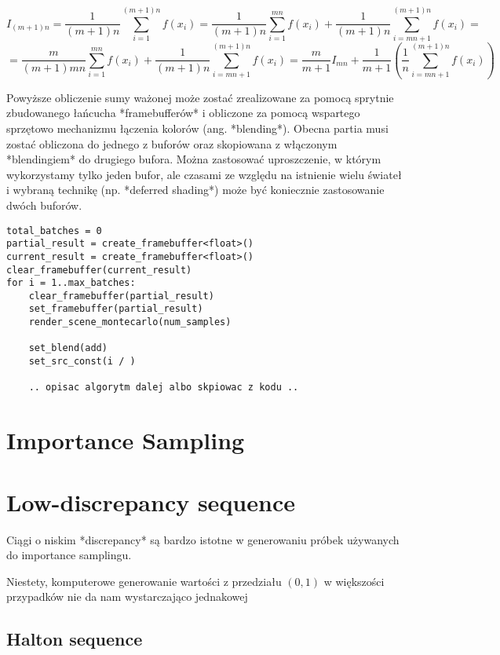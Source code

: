 \documentclass[../main.tex]{subfiles}
\begin{document}
$$
I_{(m+1)n} = \frac{1}{(m+1)n} \sum_{i=1}^{(m+1)n} f(x_i)
= \frac{1}{(m+1)n} \sum_{i=1}^{mn} f(x_i)
    + \frac{1}{(m+1)n} \sum_{i=mn+1}^{(m+1)n} f(x_i) =
$$
$$
= \frac{m}{(m+1)mn} \sum_{i=1}^{mn} f(x_i)
    + \frac{1}{(m+1)n} \sum_{i=mn+1}^{(m+1)n} f(x_i)
= \frac{m}{m+1}I_{mn}
    + \frac{1}{m+1} \left(
        \frac{1}{n} \sum_{i=mn+1}^{(m+1)n} f(x_i)
    \right)
$$

Powyższe obliczenie sumy ważonej może zostać zrealizowane za pomocą sprytnie
zbudowanego łańcucha *framebufferów* i obliczone za pomocą wspartego sprzętowo
mechanizmu łączenia kolorów (ang. *blending*). Obecna partia musi zostać
obliczona do jednego z buforów oraz skopiowana z włączonym *blendingiem* do
drugiego bufora. Można zastosować uproszczenie, w którym wykorzystamy tylko
jeden bufor, ale czasami ze względu na istnienie wielu świateł i wybraną
technikę (np. *deferred shading*) może być koniecznie zastosowanie dwóch
buforów.

\begin{lstlisting}
total_batches = 0
partial_result = create_framebuffer<float>()
current_result = create_framebuffer<float>()
clear_framebuffer(current_result)
for i = 1..max_batches:
    clear_framebuffer(partial_result)
    set_framebuffer(partial_result)
    render_scene_montecarlo(num_samples)

    set_blend(add)
    set_src_const(i / )

    .. opisac algorytm dalej albo skpiowac z kodu ..
\end{lstlisting}

\section{Importance Sampling}

\section{Low-discrepancy sequence}

Ciągi o niskim *discrepancy* są bardzo istotne w generowaniu próbek używanych
do importance samplingu.

Niestety, komputerowe generowanie wartości z przedziału $(0,1)$ w większości
przypadków nie da nam wystarczająco jednakowej

\subsection{Halton sequence}
\end{document}
